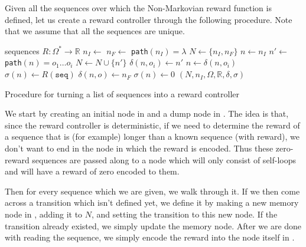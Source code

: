 Given all the sequences over which the Non-Markovian reward function is defined, let us create a reward controller through the following procedure. Note that we assume that all the sequences are unique.
\begin{algorithm}[H]
	\begin{algorithmic}[1]
		\Require sequences
		\Require $R : \Omega^* \to \mathbb{R}$
		\State $n_I \gets $   \label{l:initial_node}
		\State $n_F \gets $    \label{l:dump_node}
		\State \texttt{path}$(n_I)=\lambda$ \label{l:empty_path}
		\State $N\gets\{n_I,n_F\}$
			\State $n \gets n_I$
					\State $n'\gets$   \label{l:new_transition}
					\State \texttt{path}$(n)=o_1\dots o_i$
					\State $N \gets N \cup \{n'\}$		
					\State $\delta(n,o_i) \gets n'$	\label{l:set_transition}
				\EndIf 
				\State $n \gets \delta(n,o_i)$     
			\EndFor
			\State $\sigma(n) \gets R(\texttt{seq})$  \label{l:set_reward}
		\EndFor
		 
				 
					\State $\delta(n,o) \gets n_F$ \label{l:self_loop}
				\EndIf
			\EndFor
				\State $\sigma(n) \gets 0$ \label{l:set_zero}
			\EndIf
		\EndFor
		\State \Return $(N,n_I,\Omega,\mathbb{R},\delta,\sigma)$
		\EndProcedure
	\end{algorithmic}
	\caption{Procedure for turning a list of sequences into a reward controller}
	\label{procedure:into_reward_controller}
\end{algorithm}

We start by creating an initial node in  and a dump node in . The idea is that, since the reward controller is deterministic, if we need to determine the reward of a sequence that is (for example) longer than a known sequence (with reward), we don't want to end in the node in which the reward is encoded. Thus these zero-reward sequences are passed along to a node which will only consist of self-loops and will have a reward of zero encoded to them.

Then for every sequence which we are given, we walk through it. If we then come across a transition which isn't defined yet, we define it by making a new memory node in , adding it to $N$, and setting the transition to this new node. If the transition already existed, we simply update the memory node. After we are done with reading the sequence, we simply encode the reward into the node itself in .


